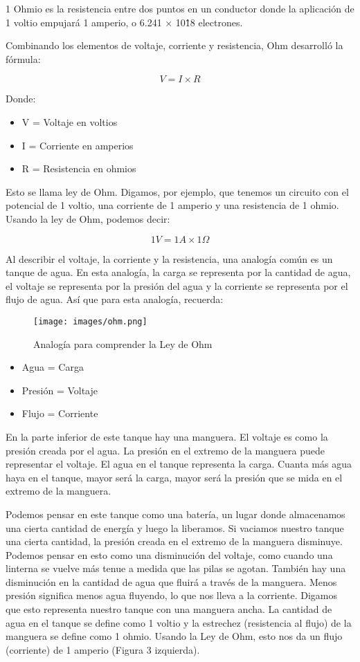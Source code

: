 \documentclass[output=paper, 
colorlinks,
citecolor=brown,
newtxmath
]{langscibook}
\begin{document}
1 Ohmio es la resistencia entre dos puntos en un conductor donde la aplicación de 1 voltio empujará 1 amperio, o 6.241 × 10\^18 electrones. 

Combinando los elementos de voltaje, corriente y resistencia, Ohm desarrolló la fórmula:

\[V = I \times R\]

Donde:

\begin{itemize}
  \setlength\itemsep{-0.5em}
\item V = Voltaje en voltios
\item I = Corriente en amperios 
\item R = Resistencia en ohmios
\end{itemize}

Esto se llama ley de Ohm. Digamos, por ejemplo, que tenemos un circuito con el potencial de 1 voltio, una corriente de 1 amperio y una resistencia de 1 ohmio. Usando la ley de Ohm, podemos decir:

\[1V = 1A \times 1Ω\]


Al describir el voltaje, la corriente y la resistencia, una analogía común es un tanque de agua. En esta analogía, la carga se representa por la cantidad de agua, el voltaje se representa por la presión del agua y la corriente se representa por el flujo de agua. Así que para esta analogía, recuerda:

\begin{figure}
\texttt{[image: images/ohm.png]}
\caption{Analogía para comprender la Ley de Ohm}
\label{fig:unidades}
\end{figure}

\begin{itemize}
  \setlength\itemsep{-0.5em}
\item Agua = Carga
\item Presión = Voltaje
\item Flujo = Corriente
\end{itemize}

En la parte inferior de este tanque hay una manguera. El voltaje es como la presión creada por el agua. La presión en el extremo de la manguera puede representar el voltaje. El agua en el tanque representa la carga. Cuanta más agua haya en el tanque, mayor será la carga, mayor será la presión que se mida en el extremo de la manguera.

Podemos pensar en este tanque como una batería, un lugar donde almacenamos una cierta cantidad de energía y luego la liberamos. Si vaciamos nuestro tanque una cierta cantidad, la presión creada en el extremo de la manguera disminuye. Podemos pensar en esto como una disminución del voltaje, como cuando una linterna se vuelve más tenue a medida que las pilas se agotan. También hay una disminución en la cantidad de agua que fluirá a través de la manguera. Menos presión significa menos agua fluyendo, lo que nos lleva a la corriente.
Digamos que esto representa nuestro tanque con una manguera ancha. La cantidad de agua en el tanque se define como 1 voltio y la estrechez (resistencia al flujo) de la manguera se define como 1 ohmio. Usando la Ley de Ohm, esto nos da un flujo (corriente) de 1 amperio (Figura 3 izquierda).
\end{document}
